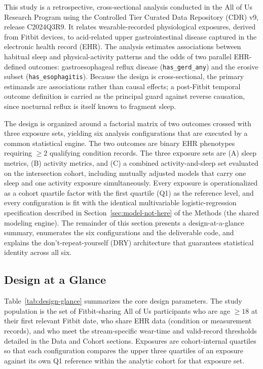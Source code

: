 \documentclass[11pt]{article}
\newcommand{\code}[1]{\texttt{\small #1}}
\begin{document}
This study is a retrospective, cross-sectional analysis conducted in the All of Us Research
Program using the Controlled Tier Curated Data Repository (CDR) v9, release C2024Q3R9. It relates
wearable-recorded physiological exposures, derived from Fitbit devices, to acid-related upper
gastrointestinal disease captured in the electronic health record (EHR). The analysis estimates
associations between habitual sleep and physical-activity patterns and the odds of two parallel
EHR-defined outcomes: gastroesophageal reflux disease (\code{has_gerd_any}) and the
erosive subset (\code{has_esophagitis}). Because the design is cross-sectional, the primary
estimands are associations rather than causal effects; a post-Fitbit temporal outcome definition is
carried as the principal guard against reverse causation, since nocturnal reflux is itself known to
fragment sleep.

The design is organized around a factorial matrix of two outcomes crossed with three exposure sets,
yielding six analysis configurations that are executed by a common statistical engine. The two
outcomes are binary EHR phenotypes requiring $\geq 2$ qualifying condition records. The three
exposure sets are (A) sleep metrics, (B) activity metrics, and (C) a combined activity-and-sleep set
evaluated on the intersection cohort, including mutually adjusted models that carry one sleep and one
activity exposure simultaneously. Every exposure is operationalized as a cohort quartile factor with
the first quartile (Q1) as the reference level, and every configuration is fit with the identical
multivariable logistic-regression specification described in Section~\ref{sec:model-not-here} of the
Methods (the shared modeling engine). The remainder of this section presents a design-at-a-glance
summary, enumerates the six configurations and the deliverable code, and explains the
don't-repeat-yourself (DRY) architecture that guarantees statistical identity across all six.

\subsection{Design at a Glance}

Table~\ref{tab:design-glance} summarizes the core design parameters. The study population is the set
of Fitbit-sharing All of Us participants who are age $\geq 18$ at their first relevant Fitbit date,
who share EHR data (condition or measurement records), and who meet the stream-specific wear-time and
valid-record thresholds detailed in the Data and Cohort sections. Exposures are cohort-internal
quartiles so that each configuration compares the upper three quartiles of an exposure against its
own Q1 reference within the analytic cohort for that exposure set.
\end{document}
